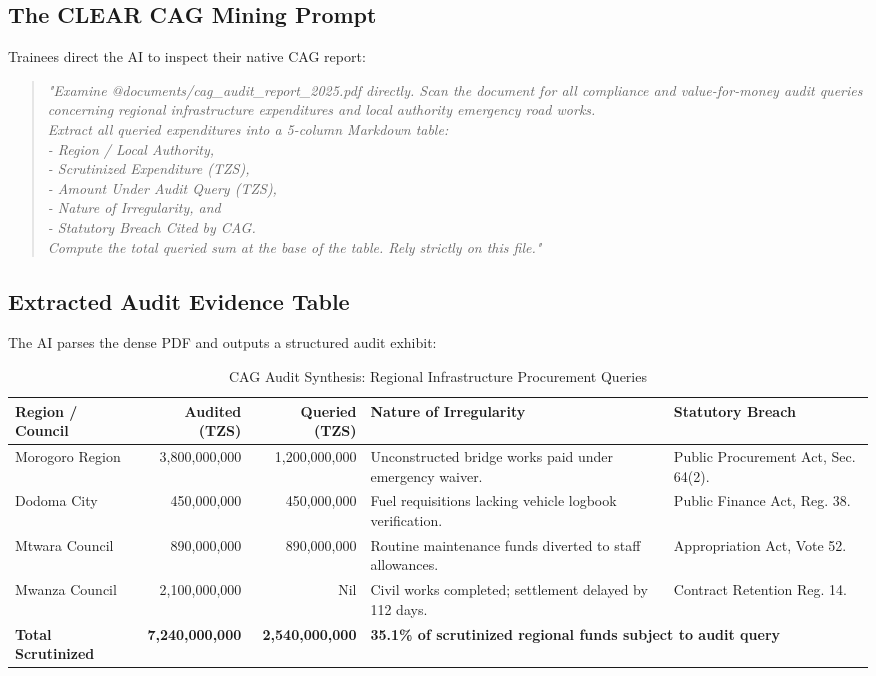 \documentclass[11pt, a4paper]{report}
\begin{document}
\subsection{The CLEAR CAG Mining Prompt}
Trainees direct the AI to inspect their native CAG report:
\begin{quote}
\small
\textit{"Examine @documents/cag\_audit\_report\_2025.pdf directly. Scan the document for all compliance and value-for-money audit queries concerning regional infrastructure expenditures and local authority emergency road works. \\
Extract all queried expenditures into a 5-column Markdown table: \\
- Region / Local Authority, \\
- Scrutinized Expenditure (TZS), \\
- Amount Under Audit Query (TZS), \\
- Nature of Irregularity, and \\
- Statutory Breach Cited by CAG. \\
Compute the total queried sum at the base of the table. Rely strictly on this file."}
\end{quote}

\subsection{Extracted Audit Evidence Table}
The AI parses the dense PDF and outputs a structured audit exhibit:

\begin{table}[htbp]
\centering
\caption{CAG Audit Synthesis: Regional Infrastructure Procurement Queries}
\vspace{0.2cm}
\begin{tabular}{lrrp{4.2cm}p{3.2cm}}
\toprule
\textbf{Region / Council} & \textbf{Audited (TZS)} & \textbf{Queried (TZS)} & \textbf{Nature of Irregularity} & \textbf{Statutory Breach} \\
\midrule
Morogoro Region & 3,800,000,000 & 1,200,000,000 & Unconstructed bridge works paid under emergency waiver. & Public Procurement Act, Sec. 64(2). \\
Dodoma City & 450,000,000 & 450,000,000 & Fuel requisitions lacking vehicle logbook verification. & Public Finance Act, Reg. 38. \\
Mtwara Council & 890,000,000 & 890,000,000 & Routine maintenance funds diverted to staff allowances. & Appropriation Act, Vote 52. \\
Mwanza Council & 2,100,000,000 & Nil & Civil works completed; settlement delayed by 112 days. & Contract Retention Reg. 14. \\
\midrule
\textbf{Total Scrutinized} & \textbf{7,240,000,000} & \textbf{2,540,000,000} & \multicolumn{2}{l}{\textbf{35.1\% of scrutinized regional funds subject to audit query}} \\
\bottomrule
\end{tabular}
\end{table}
\end{document}

